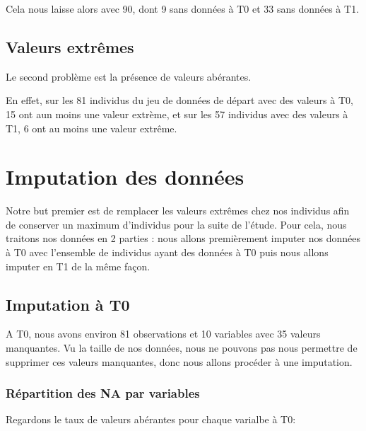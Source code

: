 \documentclass[]{article}
\begin{document}
Cela nous laisse alors avec 90, dont 9 sans données à T0 et 33 sans
données à T1.

\hypertarget{valeurs-extremes}{%
\subsection{Valeurs extrêmes}\label{valeurs-extremes}}

Le second problème est la présence de valeurs abérantes.

En effet, sur les 81 individus du jeu de données de départ avec des
valeurs à T0, 15 ont aun moins une valeur extrème, et sur les 57
individus avec des valeurs à T1, 6 ont au moins une valeur extrême.

\hypertarget{imputation-des-donnees}{%
\section{Imputation des données}\label{imputation-des-donnees}}

Notre but premier est de remplacer les valeurs extrêmes chez nos
individus afin de conserver un maximum d'individus pour la suite de
l'étude. Pour cela, nous traitons nos données en 2 parties : nous allons
premièrement imputer nos données à T0 avec l'ensemble de individus ayant
des données à T0 puis nous allons imputer en T1 de la même façon.

\hypertarget{imputation-a-t0}{%
\subsection{Imputation à T0}\label{imputation-a-t0}}

A T0, nous avons environ 81 observations et 10 variables avec 35 valeurs
manquantes. Vu la taille de nos données, nous ne pouvons pas nous
permettre de supprimer ces valeurs manquantes, donc nous allons procéder
à une imputation.

\hypertarget{repartition-des-na-par-variables}{%
\subsubsection{Répartition des NA par
variables}\label{repartition-des-na-par-variables}}

Regardons le taux de valeurs abérantes pour chaque varialbe à T0:
\end{document}
